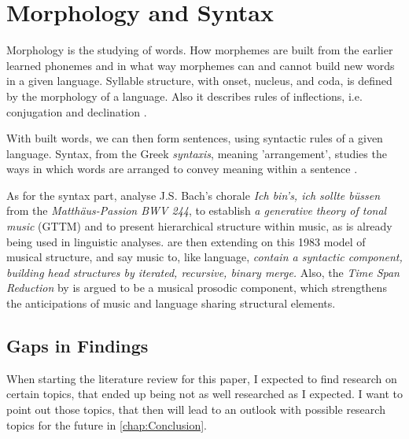 \newpage
\section{Morphology and Syntax}
\label{Morphology and Syntax}

Morphology is the studying of words. How morphemes are built from the earlier learned phonemes and in what way morphemes can and cannot build new words in a given language. Syllable structure, with onset, nucleus, and coda, is defined by the morphology of a language. Also it describes rules of inflections, i.e. conjugation and declination \cite{bauer2003introducing}.

With built words, we can then form sentences, using syntactic rules of a given language. Syntax, from the Greek \textit{syntaxis}, meaning 'arrangement', studies the ways in which words are arranged to convey meaning within a sentence \cite{van2001introduction,matthews1982syntax}.

As for the syntax part, \cite{lerdahl1983overview} analyse J.S. Bach's chorale \textit{Ich bin's, ich sollte büssen} from the \textit{Matthäus-Passion BWV 244}, to establish \textit{a generative theory of tonal music} (GTTM) and to present hierarchical structure within music, as is already being used in linguistic analyses.
\cite{katz2011identity} are then extending on this 1983 model of musical structure, and say music to, like language, \textit{contain a syntactic component, building head structures by iterated, recursive, binary merge.} Also, the \textit{Time Span Reduction} by \cite{lerdahl1983overview} is argued to be a musical prosodic component, which strengthens the anticipations of music and language sharing structural elements.

\subsection*{Gaps in Findings}

When starting the literature review for this paper, I expected to find research on certain topics, that ended up being not as well researched as I expected. I want to point out those topics, that then will lead to an outlook with possible research topics for the future in \autoref{chap:Conclusion}.


